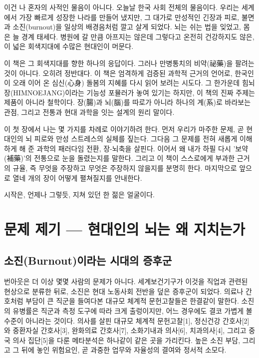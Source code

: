 \documentclass[12pt,oneside]{book}
\begin{document}
이건 나 혼자의 사적인 물음이 아니다. 오늘날 한국 사회 전체의 물음이다. 우리는 세계에서 가장 빠르게 성장한 나라를 만들어 냈지만, 그 대가로 만성적인 긴장과 피로, 불면과 소진(burnout)을 일상의 배경음처럼 깔고 살게 되었다. 뇌는 쉬는 법을 잊었고, 몸은 늘 경계 태세다. 병원에 갈 만큼 아프지는 않은데 그렇다고 온전히 건강하지도 않은, 이 넓은 회색지대에 수많은 현대인이 머문다.

이 책은 그 회색지대를 향한 하나의 응답이다. 그러나 만병통치의 비약(祕藥)을 팔려는 것이 아니다. 오히려 정반대다. 이 책은 엄격하게 검증된 과학적 근거의 언어로, 한국인이 오래 이어 온 심신(心身) 돌봄의 지혜를 다시 읽어 보려는 시도다. 그 한가운데 힘뇌장(HIMNOEJANG)이라는 기능성 포뮬러가 놓여 있기는 하지만, 이 책의 진짜 주제는 제품이 아니라 철학이다. 장(腸)과 뇌(腦)를 따로가 아니라 하나의 계(系)로 바라보는 관점, 그리고 전통과 현대 과학을 잇는 설계의 원리 말이다.

이 첫 장에서 나는 몇 가지를 차례로 이야기하려 한다. 먼저 우리가 마주한 문제, 곧 현대인의 뇌 피로와 만성 스트레스의 실체를 짚는다. 그다음 그 문제를 전혀 새롭게 이해하게 해 준 과학의 패러다임 전환, 장-뇌축을 살핀다. 이어서 왜 내가 하필 다시 '보약(補藥)'의 전통으로 눈을 돌렸는지를 말한다. 그리고 이 책이 스스로에게 부과한 근거의 규율, 즉 무엇을 주장하고 무엇은 주장하지 않을지를 분명히 한다. 마지막으로 앞으로 열네 개의 장이 어떻게 펼쳐질지를 안내한다.

시작은, 언제나 그렇듯, 지쳐 있던 한 젊은 얼굴이다.

\section{문제 제기 — 현대인의 뇌는 왜 지치는가}

\subsection{소진(Burnout)이라는 시대의 증후군}

번아웃은 더 이상 몇몇 사람의 문제가 아니다. 세계보건기구가 이것을 직업과 관련된 현상으로 분류한 뒤로, 소진은 현대 노동사회 전반을 덮은 증후군이 되었다. 의료나 간호처럼 부담이 큰 직군을 들여다본 대규모 체계적 문헌고찰들은 한결같이 말한다. 소진의 유병률은 직군과 측정 도구에 따라 크게 출렁이지만, 어느 경우에도 결코 가볍게 볼 수준이 아니라는 것이다. 의사를 살핀 대규모 체계적 문헌고찰[1], 정신건강 간호사[2]와 중환자실 간호사[3], 완화의료 간호사[7], 소화기내과 의사[6], 치과의사[4], 그리고 중국 의사 집단[5]을 다룬 메타분석은 하나같이 같은 곳을 가리킨다. 높은 소진 부담, 그리고 그 뒤에 놓인 위험요인, 곧 과중한 업무와 자율성의 결여와 정서적 소모다.
\end{document}
